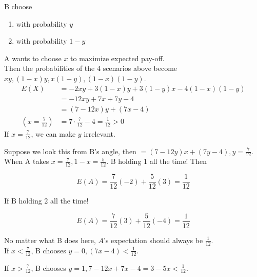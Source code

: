 \documentclass[a4paper, 11pt, twoside]{article}
\begin{document}
B choose \begin{enumerate}
	\item with probability $y$
	\item with probability $1-y$
\end{enumerate}

A wants to choose $x$ to maximize expected pay-off.\\

Then the probabilities of the 4 scenarios above become $xy, (1-x)y, x(1-y), (1-x)(1-y)$.\\

\[\begin{split}
	E(X)&=-2xy+3(1-x)y+3(1-y)x-4(1-x)(1-y)\\
	&=-12xy+7x+7y-4\\
	&=(7-12x)y+(7x-4)\\
	(x=\frac{7}{12})&=7\cdot \frac{7}{12}-4=\frac{1}{12}>0
\end{split}
\]
If $x=\frac{7}{12}$, we can make $y$ irrelevant.

Suppose we look this from B's angle, then $=(7-12y)x+(7y-4), y=\frac{7}{12}$.\\

When A takes $x=\frac{7}{12}, 1-x=\frac{5}{12}$. B holding 1 all the time! Then

\[E(A)=\frac{7}{12}(-2)+\frac{5}{12}(3)=\frac{1}{12}\]

If B holding 2 all the time!

\[E(A)=\frac{7}{12}(3)+\frac{5}{12}(-4)=\frac{1}{12}\]

No matter what B does here, $A$'s expectation should always be $\frac{1}{12}$.\\

If $x<\frac{7}{12}$, B chooses $y=0, (7x-4)<\frac{1}{12}$.

If $x>\frac{7}{12}$, B chooses $y=1, 7-12x+7x-4=3-5x<\frac{1}{12}$. 
\end{document}
